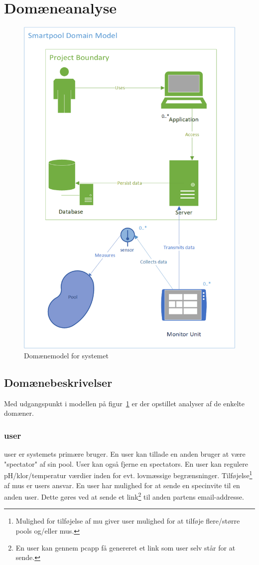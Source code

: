 \section{Domæneanalyse}

\begin{figure}
	\centering
	\includegraphics[width=0.7\linewidth]{figs/ProjectBoundary}
	\caption{Domænemodel for systemet}
	\label{fig:domainmodelboundary}
\end{figure}


\subsection{Domænebeskrivelser}
Med udgangspunkt i modellen på figur~\ref{fig:domainmodelboundary} er der opstillet analyser af de enkelte domæner.

\subsubsection{\gls{user}}
\gls{user} er systemets primære bruger. En \gls{user} kan tillade en anden bruger at være "spectator" af sin pool. User kan også fjerne en \glspl{spectator}. En \gls{user} kan regulere pH/klor/temperatur værdier inden for evt. lovmæssige begrænsninger. Tilføjelse\footnote{Mulighed for tilføjelse af  \gls{mu} giver \gls{user} mulighed for at tilføje flere/større \glspl{pool} og/eller \glspl{mu}.} af \glspl{mu} er \glspl{user} ansvar. En \gls{user} har mulighed for at sende en \gls{specinvite} til en anden \gls{user}. Dette gøres ved at sende et link\footnote{En \gls{user} kan gennem \gls{pcapp} få genereret et link som \gls{user} selv står for at sende.}  til anden partens email-addresse.


